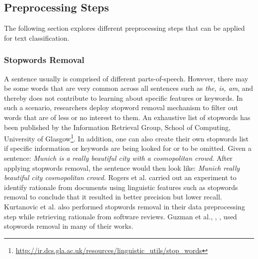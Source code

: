 \documentclass[a4paper,12pt,twoside]{report}
\begin{document}
\subsection{Preprocessing Steps}
The following section explores different preprocessing steps that can be applied for text classification. 

\subsubsection{Stopwords Removal}
A sentence usually is comprised of different parts-of-speech. However, there may be some words that are very common across all sentences such as \textit{the, is, am}, and thereby does not contribute to learning about specific features or keywords. In such a scenario, researchers deploy stopword removal mechanism to filter out words that are of less or no interest to them. An exhaustive list of stopwords has been published by the Information Retrieval Group, School of Computing, University of Glasgow\footnote{\url{http://ir.dcs.gla.ac.uk/resources/linguistic_utils/stop_words}}. In addition, one can also create their own stopwords list if specific information or keywords are being looked for or to be omitted. 
\newline \newline
Given a sentence: \textit{Munich is a really beautiful city with a cosmopolitan crowd.} 
\newline \newline
After applying stopwords removal, the sentence would then look like: \textit{Munich really beautiful city cosmopolitan crowd.} 
\newline \newline
Rogers et al.\cite{Rogers2012} carried out an experiment to identify rationale from documents using linguistic features such as stopwords removal to conclude that it resulted in better precision but lower recall. Kurtanovic et al.\cite{Kurtanovic2017} also performed stopwords removal in their data preprocessing step while retrieving rationale from software reviews. Guzman et al.\cite{Guzman2017}, \cite{Guzman2017a}, \cite{Guzman2016}, \cite{Guzman2014} used stopwords removal in many of their works.
\end{document}
